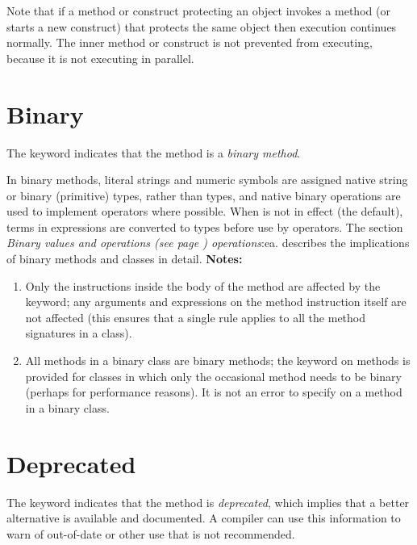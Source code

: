 Note that if a method or construct protecting an object invokes a method
(or starts a new construct) that protects the same object then execution
continues normally.  The inner method or construct is not prevented from
executing, because it is not executing in parallel.
\section{Binary}\label{refbinme}
 
The keyword  indicates that the method is a \emph{binary
method}.
 
In binary methods, literal strings and numeric symbols are assigned
native string or binary (primitive) types, rather than \nr{} types,
and native binary operations are used to implement operators where
possible.
When  is not in effect (the default), terms in
expressions are converted to \nr{} types before use by operators.
The section  \emph{Binary values and operations (see page \pageref{refbinary}) 
operations}:ea. describes the implications of binary methods and
classes in detail.
 \textbf{Notes:}
\begin{enumerate}
\item 
Only the instructions inside the body of the method are affected by the
 keyword; any arguments and expressions on the method
instruction itself are not affected (this ensures that a single rule
applies to all the method signatures in a class).
\item 
All methods in a binary class are binary methods; the 
keyword on methods is provided for classes in which only the occasional
method needs to be binary (perhaps for performance reasons).
It is not an error to specify  on a method in a binary
class.
\end{enumerate}
\section{Deprecated}\label{refdepme}
 
The keyword  indicates that the method
is \emph{deprecated}, which implies that a better alternative is
available and documented.  A compiler can use this information to warn
of out-of-date or other use that is not recommended.
 
